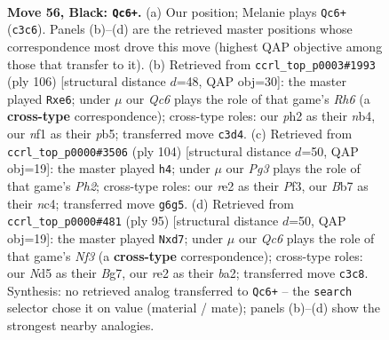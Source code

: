 \documentclass[11pt]{article}
\begin{document}
\clearpage

\begin{figure}[p]\centering
\begin{subfigure}{0.46\textwidth}\centering
\resizebox{\linewidth}{!}{%
\newchessgame
\chessboard[
  setfen={8/1b3pk1/6p1/1K1n4/3R3P/2q5/4R2P/5N2 b - - 20 56},
  showmover=false,
  pgfstyle=straightmove, color=movearrow, markmove={c3-c6}
]}
\caption{}
\end{subfigure}\hfill
\begin{subfigure}{0.46\textwidth}\centering
\resizebox{\linewidth}{!}{%
\newchessgame
\chessboard[
  setfen={6k1/8/p3p2R/1p3N2/1n6/r6P/6PK/8 w - - 0 54},
  showmover=false,
  pgfstyle=straightmove, color=movearrow, markmove={h6-e6}
]}
\caption{}
\end{subfigure}
\\[4pt]
\begin{subfigure}{0.46\textwidth}\centering
\resizebox{\linewidth}{!}{%
\newchessgame
\chessboard[
  setfen={3R4/6pk/1p5p/1r1N4/2n5/5P2/6PP/6K1 w - - 4 53},
  showmover=false,
  pgfstyle=straightmove, color=movearrow, markmove={h2-h4}
]}
\caption{}
\end{subfigure}\hfill
\begin{subfigure}{0.46\textwidth}\centering
\resizebox{\linewidth}{!}{%
\newchessgame
\chessboard[
  setfen={8/3R2b1/5npk/7p/8/7P/B4PP1/3N1K2 b - - 0 48},
  showmover=false,
  pgfstyle=straightmove, color=movearrow, markmove={f6-d7}
]}
\caption{}
\end{subfigure}
\caption{\textbf{Move 56, Black: \texttt{Qc6+}.} (a) Our position; Melanie plays \texttt{Qc6+} (\texttt{c3c6}). Panels (b)--(d) are the retrieved master positions whose correspondence most drove this move (highest QAP objective among those that transfer to it). (b) Retrieved from \texttt{ccrl\_top\_p0003\#1993} (ply 106) [structural distance $d$=48, QAP obj=30]: the master played \texttt{Rxe6}; under $\mu$ our \emph{Qc6} plays the role of that game's \emph{Rh6} (a \textbf{cross-type} correspondence); cross-type roles: our \emph{p}h2 as their \emph{n}b4, our \emph{n}f1 as their \emph{p}b5; transferred move \texttt{c3d4}. (c) Retrieved from \texttt{ccrl\_top\_p0000\#3506} (ply 104) [structural distance $d$=50, QAP obj=19]: the master played \texttt{h4}; under $\mu$ our \emph{Pg3} plays the role of that game's \emph{Ph2}; cross-type roles: our \emph{r}e2 as their \emph{P}f3, our \emph{B}b7 as their \emph{n}c4; transferred move \texttt{g6g5}. (d) Retrieved from \texttt{ccrl\_top\_p0000\#481} (ply 95) [structural distance $d$=50, QAP obj=19]: the master played \texttt{Nxd7}; under $\mu$ our \emph{Qc6} plays the role of that game's \emph{Nf3} (a \textbf{cross-type} correspondence); cross-type roles: our \emph{N}d5 as their \emph{B}g7, our \emph{r}e2 as their \emph{b}a2; transferred move \texttt{c3c8}. Synthesis: no retrieved analog transferred to \texttt{Qc6+} -- the \texttt{search} selector chose it on value (material / mate); panels (b)--(d) show the strongest nearby analogies.}
\label{fig:thought-m111}
\end{figure}
\end{document}
